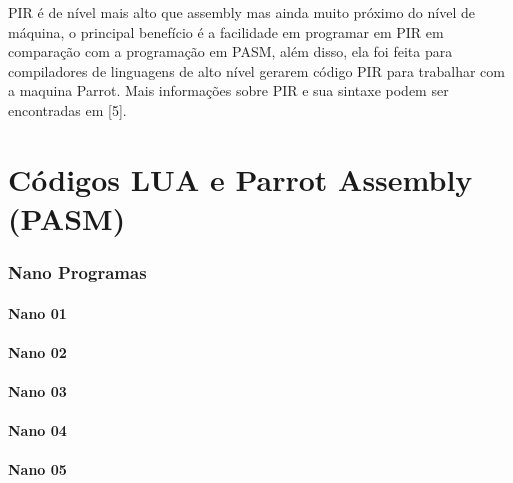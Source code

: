 \documentclass[12pt,a4paper,twoside]{report}
\begin{document}
PIR é de nível mais alto que assembly mas ainda muito próximo do nível
de máquina, o principal benefício é a facilidade em programar em PIR
em comparação com a programação em PASM, além disso, ela foi feita
para compiladores de linguagens de alto nível gerarem código PIR para
trabalhar com a maquina Parrot.
Mais informações sobre PIR e sua sintaxe podem ser encontradas em [5].

\chapter{Códigos LUA e Parrot Assembly (PASM)}

\subsection{Nano Programas}
\subsubsection{Nano 01}



\subsubsection{Nano 02}



\subsubsection{Nano 03}



\subsubsection{Nano 04}



\subsubsection{Nano 05}


\end{document}

